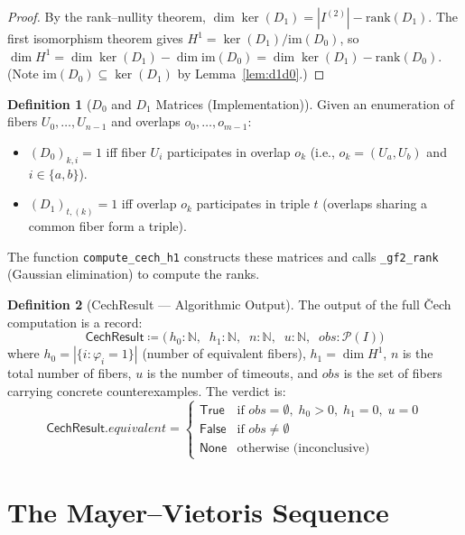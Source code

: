\documentclass[11pt,a4paper]{report}
\theoremstyle{definition}
\newtheorem{definition}{Definition}[chapter]
\theoremstyle{plain}
\newcommand{\Nat}{\mathbb{N}}
\newcommand{\Hone}{H^1}
\begin{document}
\begin{proof}
By the rank--nullity theorem, $\dim \ker(D_1) = |I^{(2)}| - \mathrm{rank}(D_1)$.
The first isomorphism theorem gives
$\Hone = \ker(D_1) / \mathrm{im}(D_0)$, so
$\dim \Hone = \dim \ker(D_1) - \dim \mathrm{im}(D_0) = \dim \ker(D_1) - \mathrm{rank}(D_0)$.
(Note $\mathrm{im}(D_0) \subseteq \ker(D_1)$ by Lemma~\ref{lem:d1d0}.)
\end{proof}

\begin{definition}[$D_0$ and $D_1$ Matrices (Implementation)]
\label{def:d0d1-matrices}
Given an enumeration of fibers $U_0, \ldots, U_{n-1}$ and overlaps
$o_0, \ldots, o_{m-1}$:
\begin{itemize}
  \item $(D_0)_{k,i} = 1$ iff fiber $U_i$ participates in overlap $o_k$
    (i.e., $o_k = (U_a, U_b)$ and $i \in \{a, b\}$).
  \item $(D_1)_{t,(k)} = 1$ iff overlap $o_k$ participates in triple
    $t$ (overlaps sharing a common fiber form a triple).
\end{itemize}
The function \texttt{compute\_cech\_h1} constructs these matrices
and calls \texttt{\_gf2\_rank} (Gaussian elimination) to compute
the ranks.
\end{definition}

\begin{definition}[CechResult --- Algorithmic Output]
\label{def:cech-result}
The output of the full \v{C}ech computation is a record:
\[
  \mathsf{CechResult} \coloneqq
  \bigl(\,
    h_0 : \Nat,\;\;
    h_1 : \Nat,\;\;
    n : \Nat,\;\;
    u : \Nat,\;\;
    \mathit{obs} : \mathcal{P}(I)
  \bigr)
\]
where $h_0 = |\{i : \varphi_i = 1\}|$ (number of equivalent fibers),
$h_1 = \dim \Hone$, $n$ is the total number of fibers, $u$ is the
number of timeouts, and $\mathit{obs}$ is the set of fibers carrying
concrete counterexamples.  The verdict is:
\[
  \mathsf{CechResult}.\mathit{equivalent} =
  \begin{cases}
    \mathsf{True}  & \text{if } \mathit{obs} = \emptyset,\; h_0 > 0,\;
                      h_1 = 0,\; u = 0 \\
    \mathsf{False} & \text{if } \mathit{obs} \neq \emptyset \\
    \mathsf{None}  & \text{otherwise (inconclusive)}
  \end{cases}
\]
\end{definition}


\chapter{The Mayer--Vietoris Sequence}
\label{ch:mayer-vietoris}
\end{document}
